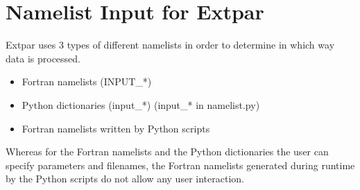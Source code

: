 \documentclass[a4paper,10pt,DIV14,BCOR1cm,titlepage,twoside]{scrartcl}
\begin{document}
\clearpage

\section{Namelist Input for Extpar} \label{namelist_input_for_extpar}
Extpar uses 3 types of different namelists in order to determine in which way data is processed.

\begin{itemize}
  \item Fortran namelists (INPUT\_*)
  \item Python dictionaries (input\_*) (input\_* in namelist.py)
  \item Fortran namelists written by Python scripts 
\end{itemize}
Whereas for the Fortran namelists and the Python dictionaries the user can specify parameters and filenames, the Fortran namelists generated during runtime by the
Python scripts do not allow any user interaction.
\end{document}
